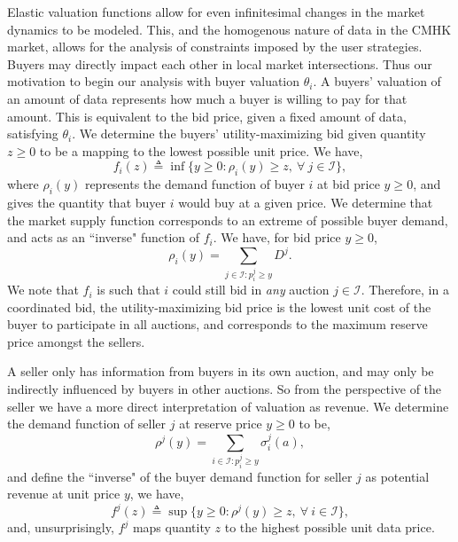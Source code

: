 \documentclass[sigconf, anonymous]{acmart}
\newcommand{\mcI}{\mathcal{I}}
\newcommand{\g}{\sigma}
\theoremstyle{definition}
\begin{document}
Elastic valuation functions allow for even infinitesimal changes in the market
dynamics to be modeled. This, and the homogenous nature of data in the CMHK market, 
allows for the analysis of constraints imposed by the user strategies. 
Buyers may directly impact each other in local market intersections.
Thus our motivation to begin our analysis with buyer valuation $\theta_i$.
A buyers' valuation of an amount of data represents how much a buyer is willing
to pay for that amount. 
This is equivalent to the bid price, given a fixed amount of data,
satisfying $\theta_i$. We determine the
buyers' utility-maximizing bid given quantity $z\ge0$ to be a mapping to the lowest
possible unit price. We have,
\begin{equation}\label{buyerinversedemand}
    f_i(z) \triangleq \inf\big\lbrace y\ge 0:
        \rho_i(y) \ge z, \ \forall \ j \in \mcI\big\rbrace,
\end{equation}
where $\rho_i(y)$ represents the demand function of buyer $i$ at bid price
$y\ge 0$, and gives the quantity that buyer $i$ would buy at a given price.
We determine that the market supply function corresponds to an extreme of
possible buyer demand, and 
acts as an ``inverse" function of $f_i$. We have, for bid price $y\ge 0$,
\begin{equation}\label{datasupply}
    \rho_i(y) = \sum_{j\in\mcI : p_i^j\ge y} D^j.
\end{equation}
We note that $f_i$ is such that
$i$ could still bid in \emph{any} auction $j\in\mcI$.
Therefore, in a coordinated bid, the utility-maximizing bid price is the
lowest unit cost of the buyer to participate in all auctions, and corresponds to
the maximum reserve price amongst the sellers. 

A seller only has
information from buyers in its own auction, and may only be indirectly influenced by
buyers in other auctions. So from the perspective of the
seller we have a more direct interpretation of valuation as revenue.
We determine the demand function of seller $j$ at reserve price $y\ge 0$ to be,
\begin{equation}\label{datademand}
    \rho^j(y) = \sum_{i\in\mcI : p_i^j\ge y} \g_i^j(a), 
\end{equation}
and define the ``inverse" of the buyer demand function for seller $j$ as
potential revenue at unit price $y$, we have, 
\begin{equation}\label{sellerinversedemand}
    f^j(z) \triangleq \sup\big\lbrace y\ge 0:
        \rho^j(y) \ge z, \ \forall \ i \in \mcI\big\rbrace,
\end{equation}
and, unsurprisingly, $f^j$ maps quantity $z$ to the highest possible unit data
price.
\end{document}

